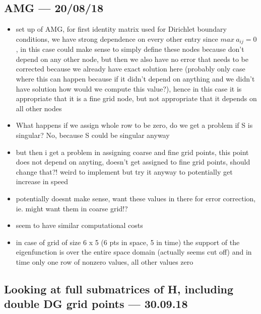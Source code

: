 \documentclass[a4paper, 11pt]{article}
\begin{document}
\subsection*{AMG --- 20/08/18}

\begin{itemize}
	\item set up of AMG, for first identity matrix used for Dirichlet boundary conditions, we have strong dependence on every other entry since $max \ a_{ij} = 0$, in this case could make sense to simply define these nodes because don't depend on any other node, but then we also have no error that needs to be corrected because we already have exact solution here (probably only case where this can happen because if it didn't depend on anything and we didn't have solution how would we compute this value?), hence in this case it is appropriate that it is a fine grid node, but not appropriate that it depends on all other nodes
	\item What happens if we assign whole row to be zero, do we get a problem if S is singular? No, because S could be singular anyway 
	\item but then i get a problem in assigning coarse and fine grid points, this point does not depend on anyting, doesn't get assigned to fine grid points, should change that?! weird to implement but try it anyway to potentially get increase in speed
	\item potentially doesnt make sense, want these values in there for error correction, ie. might want them in coarse grid!?
	\item seem to have similar computational costs
	\item in case of grid of size 6 x 5 (6 pts in space, 5 in time) the support of the eigenfunction is over the entire space domain (actually seems cut off) and in time only one row of nonzero values, all other values zero
\end{itemize}

\subsection*{Looking at full submatrices of H, including double DG grid points --- 30.09.18}
\end{document}
